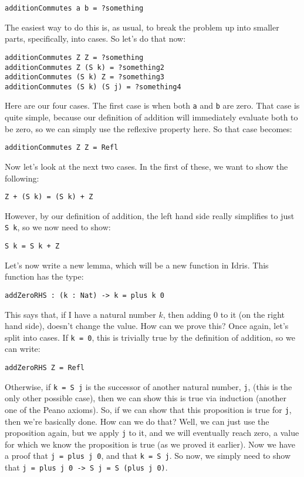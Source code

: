 \documentclass{article}
\newcommand{\inline}[1]{\texttt{#1}}
\begin{document}
\begin{verbatim}
additionCommutes a b = ?something
\end{verbatim}

The easiest way to do this is, as usual, to break the problem up into smaller parts, specifically, into cases. So let’s do that now:

\begin{verbatim}
additionCommutes Z Z = ?something
additionCommutes Z (S k) = ?something2
additionCommutes (S k) Z = ?something3
additionCommutes (S k) (S j) = ?something4
\end{verbatim}

Here are our four cases.
The first case is when both \inline{a} and \inline{b} are zero.
That case is quite simple, because our definition of addition will immediately evaluate both to be zero, so we can simply use the reflexive property here.
So that case becomes:

\begin{verbatim}
additionCommutes Z Z = Refl
\end{verbatim}

Now let’s look at the next two cases. In the first of these, we want to show the following:
\begin{verbatim}
Z + (S k) = (S k) + Z
\end{verbatim}

However, by our definition of addition, the left hand side really simplifies to just \inline{S k}, so we now need to show:

\begin{verbatim}
S k = S k + Z
\end{verbatim}

Let’s now write a new lemma, which will be a new function in Idris.
This function has the type:

\begin{verbatim}
addZeroRHS : (k : Nat) -> k = plus k 0
\end{verbatim}

This says that, if I have a natural number $k$, then adding $0$ to it (on the right hand side), doesn’t change the value.
How can we prove this?
Once again, let’s split into cases.
If \inline{k = 0}, this is trivially true by the definition of addition, so we can write:

\begin{verbatim}
addZeroRHS Z = Refl
\end{verbatim}

Otherwise, if \inline{k = S j} is the successor of another natural number, \inline{j}, (this is the only other possible case), then we can show this is true via induction (another one of the Peano axioms).
So, if we can show that this proposition is true for \inline{j}, then we’re basically done.
How can we do that?
Well, we can just use the proposition again, but we apply \inline{j} to it, and we will eventually reach zero, a value for which we know the proposition is true (as we proved it earlier).
Now we have a proof that \inline{j = plus j 0}, and that \inline{k = S j}.
So now, we simply need to show that \inline{j = plus j 0 -> S j = S (plus j 0)}.
\end{document}
